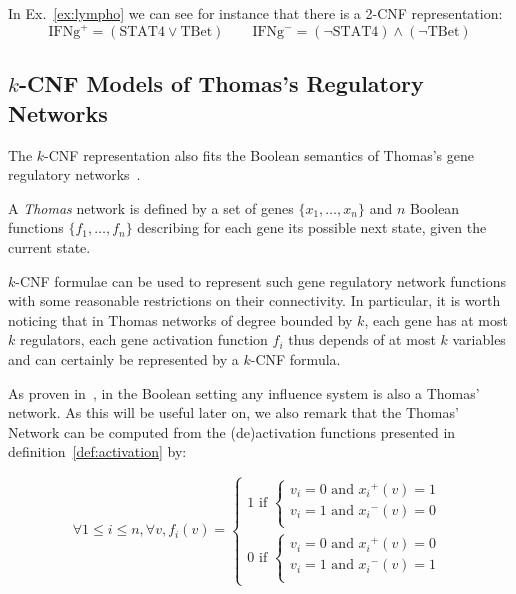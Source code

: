 \documentclass{llncs}
\begin{document}
\begin{example}
   In Ex.~\ref{ex:lympho} we can see for instance that there is a 2-CNF
   representation:
   \[\text{IFNg}^+=(\text{STAT4}\vee \text{TBet})\qquad
   \text{IFNg}^-=(\neg \text{STAT4})\wedge(\neg \text{TBet})\]
\end{example}

\subsection{$k$-CNF Models of Thomas's Regulatory Networks}

The $k$-CNF representation also fits the Boolean semantics of Thomas's gene
regulatory networks~\cite{Thomas73jtb}.

\begin{definition}
   A \emph{Thomas} network is defined by a set of genes $\{x_1,\dots,x_n\}$
   and $n$ Boolean functions $\{f_1,\dots,f_n\}$ describing for each gene its
   possible next state, given the current state.
\end{definition}

$k$-CNF formulae can be used to represent such gene regulatory network functions with some reasonable restrictions on their connectivity.
In particular, it is worth noticing that in Thomas networks of degree bounded by $k$,
each gene has at most $k$ regulators, each gene activation function $f_i$ thus depends of at most $k$ variables
and can certainly be represented by a $k$-CNF formula.

As proven in~\cite{FMRS16cmsb}, in the Boolean setting any influence system is
also a Thomas' network.
As this will be useful later on, we also remark that the Thomas' Network can be computed from the (de)activation functions presented in definition~\ref{def:activation} by:

\[
\forall 1 \leq i \leq n, \forall v, f_i(v) = \left\{\begin{array}{l}
1 \text{ if } \left\{\begin{array}{l}
v_i = 0 \text{ and } {x_i}^+(v) = 1\\
v_i = 1 \text{ and } {x_i}^-(v) = 0 \\
\end{array}\right.\\[1em]
0 \text{ if } \left\{\begin{array}{l}
v_i = 0 \text{ and } {x_i}^+(v) = 0\\
v_i = 1 \text{ and } {x_i}^-(v) = 1\\
\end{array}\right.
\end{array}\right.
\]
\end{document}
